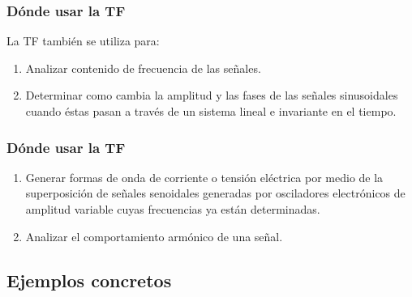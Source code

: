 \begin{frame}
\frametitle{Dónde usar la TF}
La TF también se utiliza para:
\pause
{}
\begin{enumerate}[<+->]
\item Analizar contenido de frecuencia de las señales.
\item Determinar como cambia la amplitud y las fases de las señales sinusoidales cuando éstas pasan a través de un sistema lineal e invariante en el tiempo.
\seti
\end{enumerate}    
\end{frame}
\begin{frame}
\frametitle{Dónde usar la TF}
\begin{enumerate}[<+->]
\conti
\item Generar formas de onda de corriente o tensión eléctrica por medio de la superposición de señales senoidales generadas por osciladores electrónicos de amplitud variable cuyas frecuencias ya están determinadas.
\item Analizar el comportamiento armónico de una señal.
\end{enumerate}
\end{frame}

\subsection{Ejemplos concretos}

